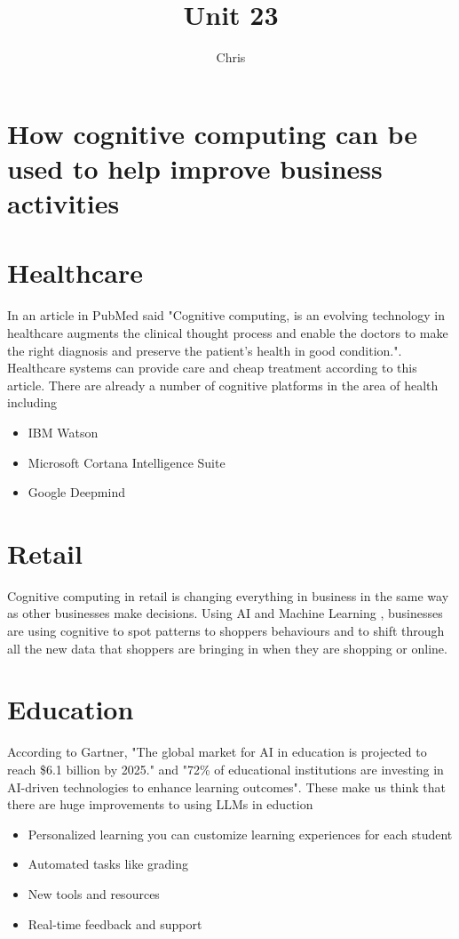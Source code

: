 \documentclass{article}
\title{Unit 23}
\author{Chris}
\date{}
\begin{document}
\section{How cognitive computing can be used to help improve business activities}

\section{Healthcare}
In an article in PubMed said "Cognitive computing, is an evolving technology in healthcare augments the clinical thought process and enable the doctors to make the right diagnosis and preserve the patient's health in good condition."\cite{pubmed}. Healthcare systems can provide care and cheap treatment according to this article.
There are already a number of cognitive platforms in the area of health including
\begin{itemize}
    \item IBM Watson
    \item Microsoft Cortana Intelligence Suite
    \item Google Deepmind
\end{itemize}



\section{Retail}
Cognitive computing in retail is changing everything in business in the same way as other businesses make decisions. Using AI and Machine Learning , businesses are using cognitive to spot patterns to shoppers behaviours and to shift through all the new data that shoppers are bringing in when they are shopping or online.

\section{Education}
According to Gartner, "The global market for AI in education is projected to reach \$6.1 billion by 2025." \cite{emb} and "72\% of educational institutions are investing in AI-driven technologies to enhance learning outcomes".
These make us think that there are huge improvements to using LLMs in eduction 
\begin{itemize}
    \item Personalized learning you can customize learning experiences for each student
    \item Automated tasks like grading
    \item New tools and resources
    \item Real-time feedback and support
\end{itemize} \cite{packtpub}
\end{document}
